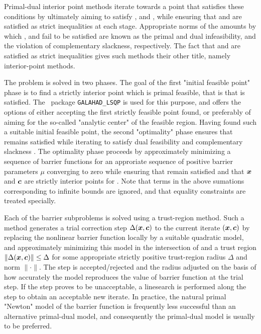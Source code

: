 \documentclass{galahad}
\begin{document}
Primal-dual interior point methods iterate towards a point
that satisfies these conditions by ultimately aiming to satisfy
,  and , while ensuring that 
 and  are 
satisfied as strict inequalities at each stage. 
Appropriate norms of the amounts by 
which ,  and  fail to be satisfied are known as the
primal and dual infeasibility, and the violation of complementary slackness,
respectively. The fact that  and  are satisfied as strict 
inequalities gives such methods their other title, namely 
interior-point methods.

The problem is solved in two phases. The goal of the first 
"initial feasible point" phase is
to find a strictly interior point which is primal feasible, that is that
 is satisfied. The \galahad\ package {\tt GALAHAD\_LSQP} 
is used for this 
purpose, and offers the options of either accepting the first 
strictly feasible point found, or preferably of aiming for the
so-called "analytic center" of the feasible region.
Having found such a suitable initial feasible point, the second "optimality"
phase ensures that  remains satisfied while iterating to
satisfy dual feasibility  and complementary slackness .
The optimality phase proceeds by approximately minimizing a 
sequence of barrier functions
for an approriate sequence of positive barrier parameters $\mu$ 
converging to zero
while ensuring that  remain satisfied and that 
${\bm{x}}$ and ${\bm{c}}$ are strictly interior points for . 
Note that terms in the above sumations corresponding to infinite bounds are
ignored, and that equality constraints are treated specially.

Each of the barrier subproblems is solved using a trust-region method.
Such a method generates a trial correction step $\Delta ({\bm{x}}, {\bm{c}})$
to the current iterate $({\bm{x}}, {\bm{c}})$
by replacing the nonlinear barrier function locally by a suitable 
quadratic model, and approximately minimizing this model in the 
intersection of 
and a trust region $\|\Delta ({\bm{x}}, {\bm{c}})\| \leq \Delta$
for some appropriate
strictly positive trust-region radius $\Delta$ and norm $\| \cdot \|$.
The step is accepted/rejected
and the radius adjusted on the basis of how accurately the model reproduces the
value of barrier function at the trial step. If the step proves to be 
unacceptable, a linesearch is performed along the step to obtain an acceptable 
new iterate. In practice, the natural primal "Newton" model of the barrier 
function is frequently less successful than an alternative primal-dual model, 
and consequently the primal-dual model is usually to be preferred.
\end{document}

